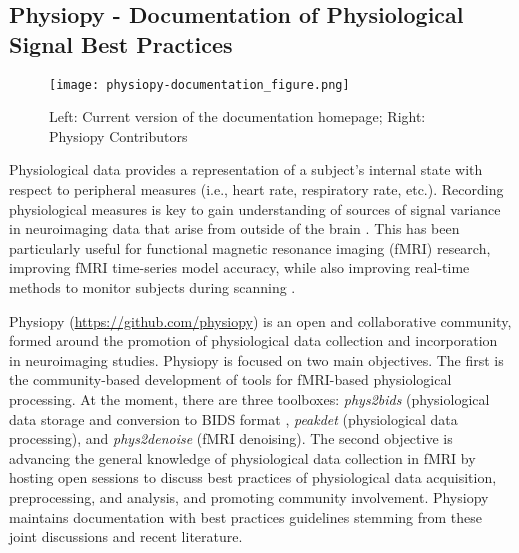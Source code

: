 \documentclass[../main.tex]{subfiles}
\begin{document}
\subsection{Physiopy - Documentation of Physiological Signal Best Practices}


\begin{figure*}
	\centering
	\texttt{[image: physiopy-documentation\_figure.png]}
	\caption{Left: Current version of the documentation homepage; Right: Physiopy Contributors}
	\label{fig:physiopy_beforeafter}
\end{figure*}

Physiological data provides a representation of a subject’s internal state with respect to peripheral measures (i.e., heart rate, respiratory rate, etc.). Recording physiological measures is key to gain understanding of sources of signal variance in neuroimaging data that arise from outside of the brain \parencite{chen2020}. This has been particularly useful for functional magnetic resonance imaging (fMRI) research, improving fMRI time-series model accuracy, while also improving real-time methods to monitor subjects during scanning \parencite{bulte2017, caballero-gaudes2017}. 

Physiopy (\url{https://github.com/physiopy}) is an open and collaborative community, formed around the promotion of physiological data collection and incorporation in neuroimaging studies. Physiopy is focused on two main objectives. The first is the community-based development of tools for fMRI-based physiological processing. At the moment, there are three toolboxes: \textit{phys2bids} (physiological data storage and conversion to BIDS format \parencite{phys2bids}, \textit{peakdet} (physiological data processing), and \textit{phys2denoise} (fMRI denoising). The second objective is advancing the general knowledge of physiological data collection in fMRI by hosting open sessions to discuss best practices of physiological data acquisition, preprocessing, and analysis, and promoting community involvement. Physiopy maintains documentation with best practices guidelines stemming from these joint discussions and recent literature.
\end{document}
